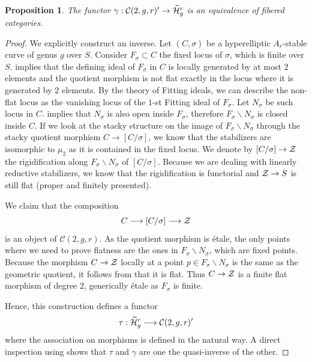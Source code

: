 \documentclass{alggeom}
\numberwithin{equation}{section}
\numberwithin{subsection}{section}
\newtheorem{proposition}[theorem]{Proposition}
\theoremstyle{definition}
\theoremstyle{remark}
\newcommand\cC{\mathcal{C}} \newcommand\cD{\mathcal{D}}
\renewcommand{\setminus}{\smallsetminus}
\newcommand{\Htilde}{\widetilde{\cH}}
\begin{document}
\begin{proposition}\label{prop:cyclic-covers}
	The functor $\gamma:\cC(2,g,r)' \rightarrow \Htilde_g^r$ is an equivalence of fibered categories.
\end{proposition}

\begin{proof}
	We explicitly construct an inverse. Let $(C,\sigma)$ be a hyperelliptic $A_r$-stable curve of genus $g$ over $S$. Consider $F_{\sigma}\subset C$ the fixed locus of $\sigma$, which is finite over $S$.  implies that the defining ideal of $F_{\sigma}$ in $C$ is locally generated by at most $2$ elements and the quotient morphism is not flat exactly in the locus where it is generated by $2$ elements. By the theory of Fitting ideals, we can describe the non-flat locus as the vanishing locus of the $1$-st Fitting ideal of $F_{\sigma}$. Let $N_{\sigma}$ be such locus in $C$.  implies that $N_{\sigma}$ is also open inside $F_{\sigma}$, therefore $F_{\sigma}\setminus N_{\sigma}$ is closed inside $C$. If we look at the stacky structure on the image of $F_{\sigma}\setminus N_{\sigma}$ through the stacky quotient morphism $C\rightarrow [C/\sigma]$, we know that the stabilizers are isomorphic to $\mu_2$ as it is contained in the fixed locus. We denote by $[C/\sigma] \rightarrow \mathcal{Z}$ the rigidification along $F_{\sigma}\setminus N_{\sigma}$ of $[C/\sigma]$. Because we are dealing with linearly reductive stabilizers, we know that the rigidification is functorial and $\mathcal{Z}\rightarrow S$ is still flat (proper and finitely presented).
	
	We claim that the composition $$C\longrightarrow [C/\sigma] \longrightarrow \mathcal{Z}$$ is an object of $\cC(2,g,r)$. As the quotient morphism is \'etale, the only points where we need to prove flatness are the ones in $F_{\sigma}\setminus N_{\sigma}$, which are fixed points. Because the morphism $C\rightarrow \mathcal{Z}$ locally at a point $p\in F_{\sigma}\setminus N_{\sigma}$ is the same as the geometric quotient, it follows from  that it is flat. Thus $C\rightarrow \mathcal{Z}$ is a finite flat morphism of degree $2$, generically \'etale as $F_{\sigma}$ is finite. 
	
	Hence, this construction defines a functor 
	$$\tau: \Htilde_g^r \longrightarrow \cC(2,g,r)'$$
	where the association on morphisms is defined in the natural way. A direct inspection using  shows that $\tau$ and $\gamma$ are one the quasi-inverse of the other. 
	
\end{proof}
\end{document}
